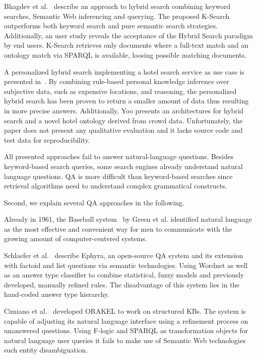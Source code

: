 Bhagdev et al.~\cite{Bhagdev:2008:HSE} describe an approach to hybrid search combining keyword searches, Semantic Web inferencing and querying. 
The proposed K-Search outperforms both keyword search and pure semantic search strategies.
Additionally, an user study reveals the acceptance of the Hybrid Search paradigm by end users.
K-Search retrieves only documents where a full-text match and an ontology match via SPARQL is available, loosing possible matching documents.

A personalized hybrid search implementing a  hotel search service as use case is presented in~\cite{DBLP:journals/kbs/Yoo12}. 
By combining rule-based personal knowledge inference over subjective data, such as expensive locations, and reasoning, the personalized hybrid search has been proven to return a smaller amount of data thus resulting in more precise answers. 
Additionally, Yoo presents an architectures for hybrid search and a novel hotel ontology derived from crowd data. 
Unfortunately, the paper does not present any qualitative evaluation and it lacks source code and test data for reproducibility. 

All presented approaches fail to answer natural-language questions.
Besides keyword-based search queries, some search engines already understand natural language questions. \ac{QA} is more difficult than keyword-based searches since retrieval algorithms need to understand complex grammatical constructs.


Second, we explain several \ac{QA} approaches in the following.

Already in 1961, the Baseball system~\cite{green1961baseball} by Green et al. identified natural language as the most effective and convenient way for men to communicate with the growing amount of computer-centered systems. 

{Schlaefer et al.~\cite{ephyra2007}} describe {Ephyra}, an open-source \ac{QA} system and its extension with factoid and list questions via semantic technologies.
Using Wordnet as well as an answer type classifier to combine statistical, fuzzy models and previously developed, manually refined rules. The disadvantage of this system lies in the hand-coded answer type hierarchy. %

Cimiano et al.~\cite{orakel} developed {ORAKEL} to work on structured \ac{KB}s.
The system is capable of adjusting its natural language interface using a refinement process on unanswered questions. 
Using F-logic and SPARQL as transformation objects for natural language user queries it fails to make use of Semantic Web technologies such entity disambiguation.

